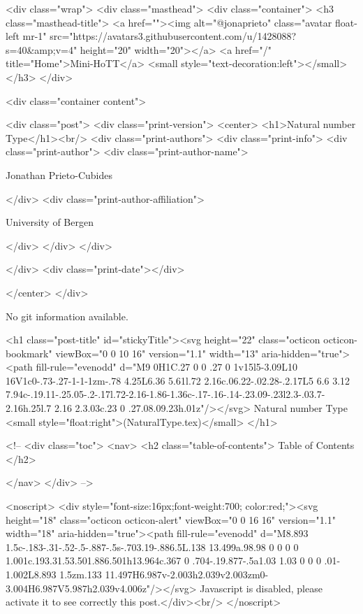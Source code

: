     <div class="wrap">
      <div class="masthead">
        <div class="container">
          <h3 class="masthead-title">
            <a href=""><img alt="@jonaprieto" class="avatar float-left mr-1" src="https://avatars3.githubusercontent.com/u/1428088?s=40&amp;v=4" height="20" width="20"></a>
            <a href="/" title="Home">Mini-HoTT</a>
            <small style="text-decoration:left"></small>
          </h3>
        </div>
      
      <div class="container content">
        







<div class="post">
  <div class="print-version">
    <center>
      <h1>Natural number Type</h1><br/>
        <div class="print-authors">
          <div class="print-info">
            <div class="print-author">
              <div class="print-author-name">
                
                  Jonathan Prieto-Cubides
                
              </div>
              <div class="print-author-affiliation">
                
                  University of Bergen
                
                </div>
            </div>
          </div>
          
          
        </div>
        <div class="print-date"></div>
        
        
    </center>
  </div>

  
  No git information available.
  

  <h1 class="post-title" id="stickyTitle"><svg height="22" class="octicon octicon-bookmark" viewBox="0 0 10 16" version="1.1" width="13" aria-hidden="true"><path fill-rule="evenodd" d="M9 0H1C.27 0 0 .27 0 1v15l5-3.09L10 16V1c0-.73-.27-1-1-1zm-.78 4.25L6.36 5.61l.72 2.16c.06.22-.02.28-.2.17L5 6.6 3.12 7.94c-.19.11-.25.05-.2-.17l.72-2.16-1.86-1.36c-.17-.16-.14-.23.09-.23l2.3-.03.7-2.16h.25l.7 2.16 2.3.03c.23 0 .27.08.09.23h.01z"/></svg> Natural number Type <small style="float:right">(NaturalType.tex)</small>
  </h1>

  <!-- 
  <div class="toc">
    <nav>
    <h2 class="table-of-contents"> Table of Contents </h2>
      

    </nav>
  </div>
   -->

  <noscript>
  <div style="font-size:16px;font-weight:700; color:red;"><svg height="18" class="octicon octicon-alert" viewBox="0 0 16 16" version="1.1" width="18" aria-hidden="true"><path fill-rule="evenodd" d="M8.893 1.5c-.183-.31-.52-.5-.887-.5s-.703.19-.886.5L.138 13.499a.98.98 0 0 0 0 1.001c.193.31.53.501.886.501h13.964c.367 0 .704-.19.877-.5a1.03 1.03 0 0 0 .01-1.002L8.893 1.5zm.133 11.497H6.987v-2.003h2.039v2.003zm0-3.004H6.987V5.987h2.039v4.006z"/></svg> Javascript is disabled, please activate it to see correctly this post.</div><br/>
  </noscript>

